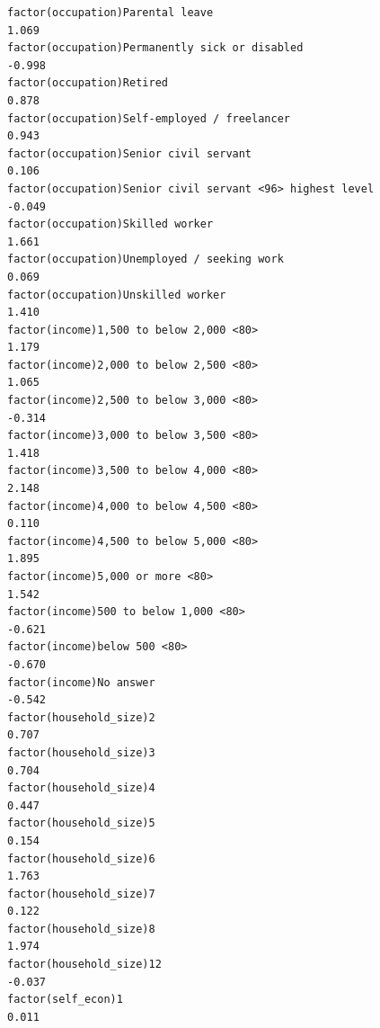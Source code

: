 \documentclass[
]{article}
\begin{document}
\begin{table}
\begin{minipage}[t]{\linewidth}
{\begin{verbatim}
factor(occupation)Parental leave                                                    1.069
factor(occupation)Permanently sick or disabled                                     -0.998
factor(occupation)Retired                                                           0.878
factor(occupation)Self-employed / freelancer                                        0.943
factor(occupation)Senior civil servant                                              0.106
factor(occupation)Senior civil servant <96> highest level                          -0.049
factor(occupation)Skilled worker                                                    1.661
factor(occupation)Unemployed / seeking work                                         0.069
factor(occupation)Unskilled worker                                                  1.410
factor(income)1,500 to below 2,000 <80>                                             1.179
factor(income)2,000 to below 2,500 <80>                                             1.065
factor(income)2,500 to below 3,000 <80>                                            -0.314
factor(income)3,000 to below 3,500 <80>                                             1.418
factor(income)3,500 to below 4,000 <80>                                             2.148
factor(income)4,000 to below 4,500 <80>                                             0.110
factor(income)4,500 to below 5,000 <80>                                             1.895
factor(income)5,000 or more <80>                                                    1.542
factor(income)500 to below 1,000 <80>                                              -0.621
factor(income)below 500 <80>                                                       -0.670
factor(income)No answer                                                            -0.542
factor(household_size)2                                                             0.707
factor(household_size)3                                                             0.704
factor(household_size)4                                                             0.447
factor(household_size)5                                                             0.154
factor(household_size)6                                                             1.763
factor(household_size)7                                                             0.122
factor(household_size)8                                                             1.974
factor(household_size)12                                                           -0.037
factor(self_econ)1                                                                  0.011

\end{verbatim}}
\end{minipage}
\end{table}
\end{document}
